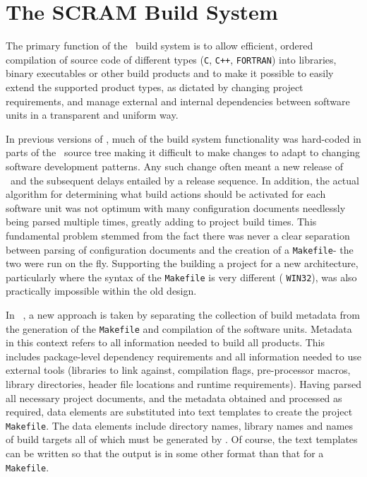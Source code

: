 \chapter{The SCRAM Build System}\label{ch:buildsystem}

The primary function of the \scram\ build system is to allow efficient,
ordered compilation of source code of different types (\eg \texttt{C},
\texttt{C++}, \texttt{FORTRAN}) into libraries, binary executables or
other build products and to make it possible to easily extend the
supported product types, as dictated by changing project requirements,
and manage external and internal dependencies between software units
in a transparent and uniform way.

\ni In previous versions of \scram, much of the build system functionality
was hard-coded in parts of the \scram\ source tree making it difficult
to make changes to adapt to changing software development patterns.
Any such change often meant a new release of \scram\ and the
subsequent delays entailed by a release sequence. In addition, the
actual algorithm for determining what build actions should be
activated for each software unit was not optimum with many
configuration documents needlessly being parsed multiple times,
greatly adding to project build times. This fundamental problem
stemmed from the fact there was never a clear separation between
parsing of configuration documents and the creation of a
\texttt{Makefile}- the two were run on the fly.  Supporting the
building a project for a new architecture, particularly where the
syntax of the \texttt{Makefile} is very different (\eg
\texttt{WIN32}), was also practically impossible within the old
design.

\ni In \scram~\scramvx, a new approach is taken by separating the
collection of build metadata from the generation of the
\texttt{Makefile} and compilation of the software units.  Metadata in
this context refers to all information needed to build all products.
This includes package-level dependency requirements and all
information needed to use external tools (\eg libraries to link
against, compilation flags, pre-processor macros, library directories,
header file locations and runtime requirements).
Having parsed all necessary project documents, and the metadata
obtained and processed as required, data elements are substituted 
into text templates to create the project \texttt{Makefile}. The data
elements include directory names, library names and names of
build targets all of which must be generated by \scram.
Of course, the text templates can be written so that the output is in
some other format than that for a \texttt{Makefile}.

